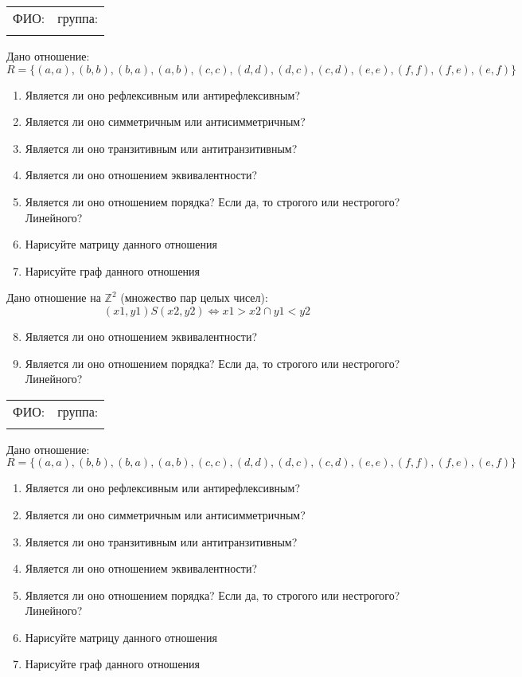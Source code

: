 \documentclass[russian,12pt]{article}
\begin{document}
\thispagestyle{empty}
\begin{tabular}{|p{}|p{}|}
\hline
ФИО: & группа: \\
 & \\ \hline
\end{tabular}

\vspace{12pt}

Дано отношение:
$$R = \{(a, a), (b, b), (b, a), (a, b), (c, c), (d, d), (d, c), (c, d), (e, e), (f, f), (f, e), (e, f)\}$$
\begin{enumerate}
\item Является ли оно рефлексивным или антирефлексивным?
\item Является ли оно симметричным или антисимметричным?
\item Является ли оно транзитивным или антитранзитивным?
\item Является ли оно отношением эквивалентности?
\item Является ли оно отношением порядка? Если да, то строгого или нестрогого? Линейного?
\item Нарисуйте матрицу данного отношения
\item Нарисуйте граф данного отношения
\end{enumerate}

Дано отношение на $\mathbb{Z}^2$ (множество пар целых чисел):
$$(x1, y1)S(x2, y2) \iff x1 > x2 \cap y1 < y2$$
\begin{enumerate}
\setcounter{enumi}{7}
\item Является ли оно отношением эквивалентности?
\item Является ли оно отношением порядка? Если да, то строгого или нестрогого? Линейного?
\end{enumerate}
\newpage
\thispagestyle{empty}
\begin{tabular}{|p{}|p{}|}
\hline
ФИО: & группа: \\
 & \\ \hline
\end{tabular}

\vspace{12pt}

Дано отношение:
$$R = \{(a, a), (b, b), (b, a), (a, b), (c, c), (d, d), (d, c), (c, d), (e, e), (f, f), (f, e), (e, f)\}$$
\begin{enumerate}
\item Является ли оно рефлексивным или антирефлексивным?
\item Является ли оно симметричным или антисимметричным?
\item Является ли оно транзитивным или антитранзитивным?
\item Является ли оно отношением эквивалентности?
\item Является ли оно отношением порядка? Если да, то строгого или нестрогого? Линейного?
\item Нарисуйте матрицу данного отношения
\item Нарисуйте граф данного отношения
\end{enumerate}
\end{document}

